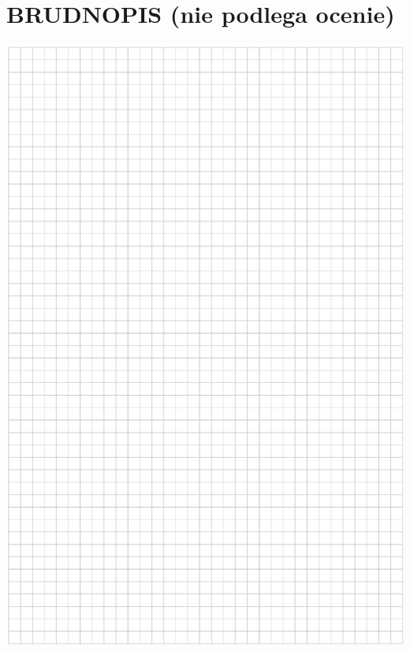 \documentclass[10pt]{article}
\begin{document}
\section*{BRUDNOPIS (nie podlega ocenie)}
\begin{center}
\includegraphics[max width=\textwidth]{2024_11_21_d51d653f4fe4a5bb0c33g-07}
\end{center}
\end{document}
